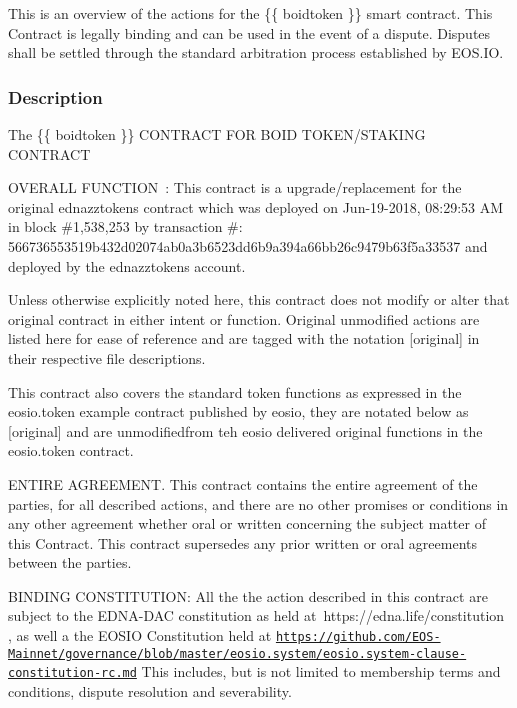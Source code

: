 This is an overview of the actions for the {\ttfamily \{\{ boidtoken \}\}} smart contract. This Contract is legally binding and can be used in the event of a dispute. Disputes shall be settled through the standard arbitration process established by E\+O\+S.\+IO.

\subsubsection*{Description}

The {\ttfamily \{\{ boidtoken \}\}} C\+O\+N\+T\+R\+A\+CT F\+OR B\+O\+ID T\+O\+K\+E\+N/\+S\+T\+A\+K\+I\+NG C\+O\+N\+T\+R\+A\+CT

O\+V\+E\+R\+A\+LL F\+U\+N\+C\+T\+I\+O\+N \+: This contract is a upgrade/replacement for the original ednazztokens contract which was deployed on Jun-\/19-\/2018, 08\+:29\+:53 AM in block \#1,538,253 by transaction \#\+: 566736553519b432d02074ab0a3b6523dd6b9a394a66bb26c9479b63f5a33537 and deployed by the ednazztokens account.

Unless otherwise explicitly noted here, this contract does not modify or alter that original contract in either intent or function. Original unmodified actions are listed here for ease of reference and are tagged with the notation \mbox{[}original\mbox{]} in their respective file descriptions.

This contract also covers the standard token functions as expressed in the eosio.\+token example contract published by eosio, they are notated below as \mbox{[}original\mbox{]} and are unmodifiedfrom teh eosio delivered original functions in the eosio.\+token contract.

E\+N\+T\+I\+RE A\+G\+R\+E\+E\+M\+E\+NT. This contract contains the entire agreement of the parties, for all described actions, and there are no other promises or conditions in any other agreement whether oral or written concerning the subject matter of this Contract. This contract supersedes any prior written or oral agreements between the parties.

B\+I\+N\+D\+I\+NG C\+O\+N\+S\+T\+I\+T\+U\+T\+I\+ON\+: All the the action described in this contract are subject to the E\+D\+N\+A-\/\+D\+AC constitution as held at https\+://edna.life/constitution , as well a the E\+O\+S\+IO Constitution held at \href{https://github.com/EOS-Mainnet/governance/blob/master/eosio.system/eosio.system-clause-constitution-rc.md}{\tt https\+://github.\+com/\+E\+O\+S-\/\+Mainnet/governance/blob/master/eosio.\+system/eosio.\+system-\/clause-\/constitution-\/rc.\+md} This includes, but is not limited to membership terms and conditions, dispute resolution and severability.

